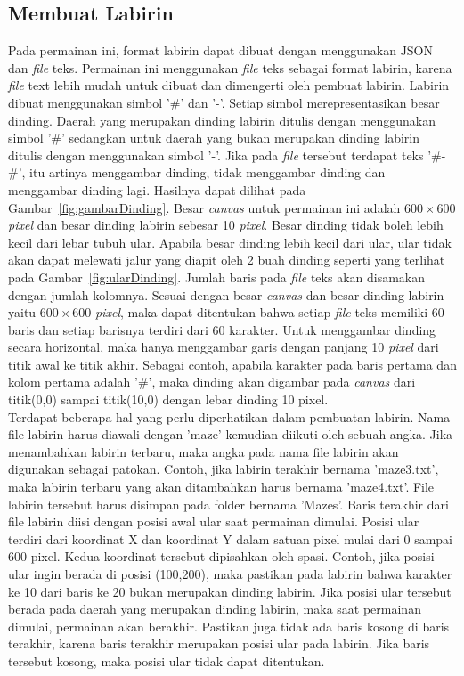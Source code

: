\subsection{Membuat Labirin}
Pada permainan ini, format labirin dapat dibuat dengan menggunakan JSON dan \textit{file} teks. Permainan ini menggunakan \textit{file} teks sebagai format labirin, karena \textit{file} text lebih mudah untuk dibuat dan dimengerti oleh pembuat labirin. Labirin dibuat menggunakan simbol '\#' dan '-'. Setiap simbol merepresentasikan besar dinding. Daerah yang merupakan dinding labirin ditulis dengan menggunakan simbol '\#' sedangkan untuk daerah yang bukan merupakan dinding labirin ditulis dengan menggunakan simbol '-'. Jika pada \textit{file} tersebut terdapat teks '\#-\#', itu artinya menggambar dinding, tidak menggambar dinding dan menggambar dinding lagi. Hasilnya dapat dilihat pada Gambar~\ref{fig:gambarDinding}. Besar \textit{canvas} untuk permainan ini adalah $600 \times 600$ \textit{pixel} dan besar dinding labirin sebesar 10 \textit{pixel}. Besar dinding tidak boleh lebih kecil dari lebar tubuh ular. Apabila besar dinding lebih kecil dari ular, ular tidak akan dapat melewati jalur yang diapit oleh 2 buah dinding seperti yang terlihat pada Gambar~\ref{fig:ularDinding}. Jumlah baris pada \textit{file} teks akan disamakan dengan jumlah kolomnya. Sesuai dengan besar \textit{canvas} dan besar dinding labirin yaitu $600 \times 600$ \textit{pixel}, maka dapat ditentukan bahwa setiap \textit{file} teks memiliki 60 baris dan setiap barisnya terdiri dari 60 karakter. Untuk menggambar dinding secara horizontal, maka hanya menggambar garis dengan panjang 10 \textit{pixel} dari titik awal ke titik akhir. Sebagai contoh, apabila karakter pada baris pertama dan kolom pertama adalah '\#', maka dinding akan digambar pada \textit{canvas} dari titik(0,0) sampai titik(10,0) dengan lebar dinding 10 pixel.\\ 

Terdapat beberapa hal yang perlu diperhatikan dalam pembuatan labirin. Nama file labirin harus diawali dengan 'maze' kemudian diikuti oleh sebuah angka. Jika menambahkan labirin terbaru, maka angka pada nama file labirin akan digunakan sebagai patokan. Contoh, jika labirin terakhir bernama 'maze3.txt', maka labirin terbaru yang akan ditambahkan harus bernama 'maze4.txt'. File labirin tersebut harus disimpan pada folder bernama 'Mazes'. Baris terakhir dari file labirin diisi dengan posisi awal ular saat permainan dimulai. Posisi ular terdiri dari koordinat X dan koordinat Y dalam satuan pixel mulai dari 0 sampai 600 pixel. Kedua koordinat tersebut dipisahkan oleh spasi. Contoh, jika posisi ular ingin berada di posisi (100,200), maka pastikan pada labirin bahwa karakter ke 10 dari baris ke 20 bukan merupakan dinding labirin. Jika posisi ular tersebut berada pada daerah yang merupakan dinding labirin, maka saat permainan dimulai, permainan akan berakhir. Pastikan juga tidak ada baris kosong di baris terakhir, karena baris terakhir merupakan posisi ular pada labirin. Jika baris tersebut kosong, maka posisi ular tidak dapat ditentukan.\\


